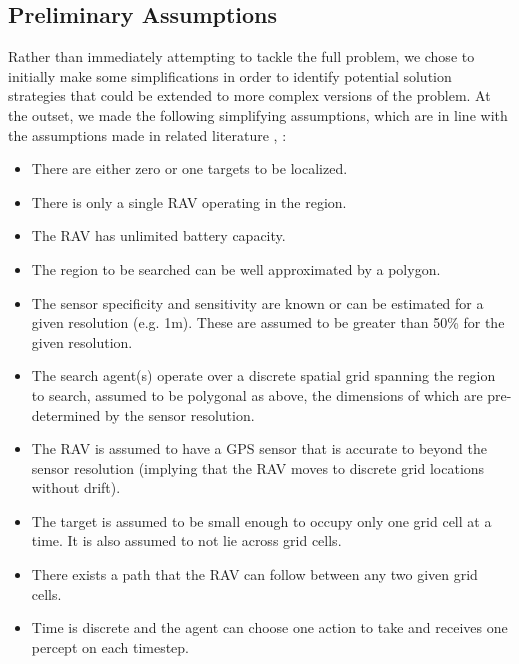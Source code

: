 \subsection{Preliminary Assumptions}\label{subsec:initalAssumptions}

Rather than immediately attempting to tackle the full problem, we chose to initially make some simplifications in order to identify potential solution strategies that could be extended to more complex versions of the problem. At the outset, we made the following simplifying assumptions, which are in line with the assumptions made in related literature \cite{Chung2007ASearch}, \cite{Chung2008Multi-agentFramework}:
\begin{itemize}
    \item There are either zero or one targets to be localized.
    \item There is only a single RAV operating in the region.
    \item The RAV has unlimited battery capacity.
    \item The region to be searched can be well approximated by a polygon.
    \item The sensor specificity and sensitivity are known or can be estimated for a given resolution (e.g. 1m). These are assumed to be greater than 50\% for the given resolution.
    \item The search agent(s) operate over a discrete spatial grid spanning the region to search, assumed to be polygonal as above, the dimensions of which are pre-determined by the sensor resolution.
    \item The RAV is assumed to have a GPS sensor that is accurate to beyond the sensor resolution (implying that the RAV moves to discrete grid locations without drift).
    \item The target is assumed to be small enough to occupy only one grid cell at a time. It is also assumed to not lie across grid cells.
    \item There exists a path that the RAV can follow between any two given grid cells.
    \item Time is discrete and the agent can choose one action to take and receives one percept on each timestep.
\end{itemize}

